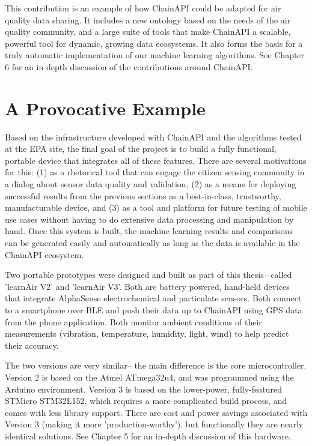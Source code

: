This contribution is an example of how ChainAPI could be adapted for air quality data sharing.  It includes a new ontology based on the needs of the air quality community, and a large suite of tools that make ChainAPI a scalable, powerful tool for dynamic, growing data ecosystems.  It also forms the basis for a truly automatic implementation of our machine learning algorithms.  See Chapter 6 for an in depth discussion of the contributions around ChainAPI.

\section{A Provocative Example}

Based on the infrastructure developed with ChainAPI and the algorithms tested at the EPA site, the final goal of the project is to build a fully functional, portable device that integrates all of these features.  There are several motivations for this: (1) as a rhetorical tool that can engage the citizen sensing community in a dialog about sensor data quality and validation, (2) as a means for deploying successful results from the previous sections as a best-in-class, trustworthy, manufacturable device, and (3) as a tool and platform for future testing of mobile use cases without having to do extensive data processing and manipulation by hand.  Once this system is built, the machine learning results and comparisons can be generated easily and automatically as long as the data is available in the ChainAPI ecosystem.

Two portable prototypes were designed and built as part of this thesis-- called 'learnAir V2' and 'learnAir V3'.  Both are battery powered, hand-held devices that integrate AlphaSense electrochemical and particulate sensors.  Both connect to a smartphone over BLE and push their data up to ChainAPI using GPS data from the phone application.  Both monitor ambient conditions of their measurements (vibration, temperature, humidity, light, wind) to help predict their accuracy.  

The two versions are very similar-- the main difference is the core microcontroller.  Version 2 is based on the Atmel ATmega32u4, and was programmed using the Arduino environment.  Version 3 is based on the lower-power, fully-featured STMicro STM32L152, which requires a more complicated build process, and comes with less library support.  There are cost and power savings associated with Version 3 (making it more 'production-worthy'), but functionally they are nearly identical solutions.  See Chapter 5 for an in-depth discussion of this hardware.



















